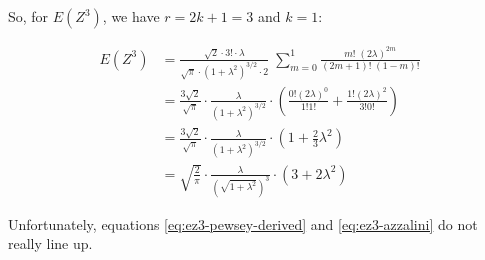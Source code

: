 So, for $E(Z^3)$, we have $r = 2k + 1 = 3$ and $k = 1$:

\begin{align}
  E(Z^3) &= \frac{\sqrt{2} \cdot 3! \cdot \lambda}{\sqrt{\pi} \cdot (1 + \lambda^2)^{3/2} \cdot 2} \; \sum_{m=0}^1 \frac{m!\;(2\lambda)^{2m}}{(2m + 1)!\;(1 - m)!} \nonumber \\
  &= \frac{3\sqrt{2}}{\sqrt{\pi}} \cdot \frac{\lambda}{(1 + \lambda^2)^{3/2}} \cdot \left( \frac{0! (2\lambda)^0}{1!1!} + \frac{1! (2\lambda)^2}{3!0!} \right) \nonumber \\
  &= \frac{3\sqrt{2}}{\sqrt{\pi}} \cdot \frac{\lambda}{(1 + \lambda^2)^{3/2}} \cdot \left( 1 + \frac{2}{3}\lambda^2 \right) \nonumber \\
  &= \sqrt{\frac{2}{\pi}} \cdot \frac{\lambda}{(\sqrt{1 + \lambda^2})^3} \cdot (3 + 2 \lambda^2) \label{eq:ez3-azzalini}
\end{align}

Unfortunately, equations \eqref{eq:ez3-pewsey-derived} and
\eqref{eq:ez3-azzalini} do not really line up.
